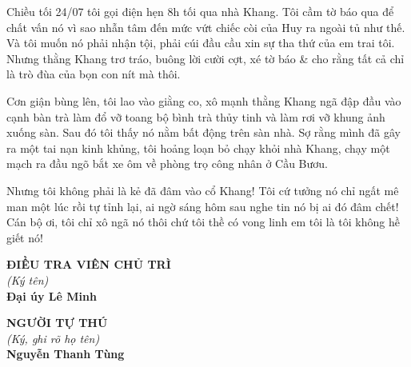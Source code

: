 \documentclass[12pt,a4paper]{article}
\begin{document}
Chiều tối 24/07 tôi gọi điện hẹn 8h tối qua nhà Khang. Tôi cầm tờ báo qua để chất vấn nó vì sao nhẫn tâm đến mức vứt chiếc còi của Huy ra ngoài tủ như thế. Và tôi muốn nó phải nhận tội, phải cúi đầu cầu xin sự tha thứ của em trai tôi. Nhưng thằng Khang trơ tráo, buông lời cười cợt, xé tờ báo \& cho rằng tất cả chỉ là trò đùa của bọn con nít mà thôi.


Cơn giận bùng lên, tôi lao vào giằng co, xô mạnh thằng Khang ngã đập đầu vào cạnh bàn trà làm đổ vỡ toang bộ bình trà thủy tinh và làm rơi vỡ khung ảnh xuống sàn. Sau đó tôi thấy nó nằm bất động trên sàn nhà. Sợ rằng mình đã gây ra một tai nạn kinh khủng, tôi hoảng loạn bỏ chạy khỏi nhà Khang, chạy một mạch ra đầu ngõ bắt xe ôm về phòng trọ công nhân ở Cầu Bươu.

Nhưng tôi không phải là kẻ đã đâm vào cổ Khang! Tôi cứ tưởng nó chỉ ngất mê man một lúc rồi tự tỉnh lại, ai ngờ sáng hôm sau nghe tin nó bị ai đó đâm chết! Cán bộ ơi, tôi chỉ xô ngã nó thôi chứ tôi thề có vong linh em tôi là tôi không hề giết nó!

\vspace{0.8cm}
\noindent
\begin{minipage}[t]{0.48\textwidth}
    \begin{center}
        \textbf{ĐIỀU TRA VIÊN CHỦ TRÌ}\\[0.1cm]
        \textit{(Ký tên)}\\[1.6cm]
        \textbf{Đại úy Lê Minh}
    \end{center}
\end{minipage}
\hfill
\begin{minipage}[t]{0.48\textwidth}
    \begin{center}
        \textbf{NGƯỜI TỰ THÚ}\\[0.1cm]
        \textit{(Ký, ghi rõ họ tên)}\\[1.6cm]
        \textbf{Nguyễn Thanh Tùng}
    \end{center}
\end{minipage}
\end{document}
